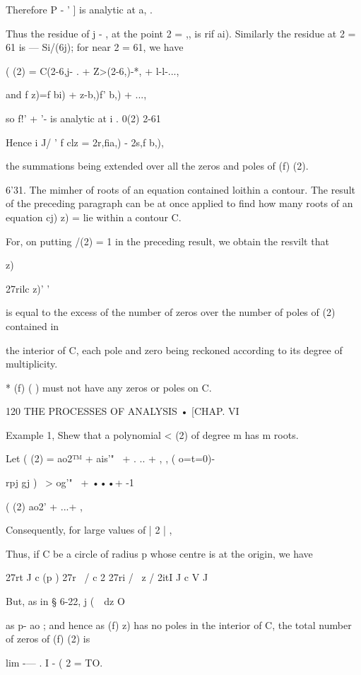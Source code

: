 Therefore P - ' ] is analytic at a, .

Thus the residue of j - , at the point 2 = ,, is rif ai). Similarly
the residue at 2 = 61 is — Si/(6j); for near 2 = 61, we have

( (2) = C(2-6,j- . + Z>(2-6,)-*, + l-l-...,

and f z)=f bi) + z-b,)f' b,) + ...,

so f!' + '- is analytic at i . 0(2) 2-61

Hence i J/ ' f clz = 2r,fia,) - 2s,f b,),

the summations being extended over all the zeros and poles of (f) (2).

6'31. The mimher of roots of an equation contained loithin a contour.
The result of the preceding paragraph can be at once applied to find
how many roots of an equation cj) z) = lie within a contour C.

For, on putting /(2) = 1 in the preceding result, we obtain the
resvilt that



z)



27rilc z)' '

is equal to the excess of the number of zeros over the number of poles
of (2) contained in

the interior of C, each pole and zero being reckoned according to its
degree of multiplicity.

* (f) ( ) must not have any zeros or poles on C.



120 THE PROCESSES OF ANALYSIS • [CHAP. VI

Example 1, Shew that a polynomial < (2) of degree m has m roots.

Let ( (2) = ao2™ + ais'"~ + . .. + , , ( o=t=0)-

rpj gj ) \ > og'"~ + •••+ -1

( (2) ao2' + ...+ ,

Consequently, for large values of | 2 | ,

Thus, if C be a circle of radius p whose centre is at the origin, we
have

27rt J c (p ) 27r \ / c 2 27ri / \ z / 2itI J c V J

But, as in § 6-22, j (\ \ dz O

as p- ao ; and hence as (f) z) has no poles in the interior of C, the
total number of zeros of (f) (2) is

lim -— . I - ( 2 = TO.

